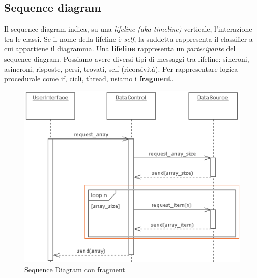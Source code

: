\documentclass[11pt]{article}
\begin{document}
\subsection{Sequence diagram} 
Il sequence diagram indica, su una \textit{lifeline (aka timeline)} verticale, l'interazione tra le classi. Se il nome della lifeline è \textit{self}, la suddetta rappresenta il classifier a cui appartiene il diagramma. Una \textbf{lifeline} rappresenta un \textit{partecipante} del sequence diagram. Possiamo avere diversi tipi di messaggi tra lifeline: sincroni, asincroni, risposte, persi, trovati, self (ricorsività). Per rappresentare logica procedurale come if, cicli, thread, usiamo i \textbf{fragment}. 
\begin{figure}[H]
    \centering
    \includegraphics[width=0.6\linewidth]{res/teoria/SequenceDiagram.png}
    \caption{Sequence Diagram con fragment}
\end{figure}
\end{document}
